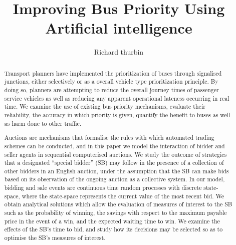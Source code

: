 \documentclass{comjnl}
\begin{document}
\title[Improving Bus Priority through Signalised Junctions using Artificial intelligence]{Improving Bus Priority Using Artificial intelligence}
\author{Richard thurbin}






\begin{abstract}

    Transport planners have implemented the prioritization of buses through signalised junctions, either selectively or as a overall vehicle type prioritization principle. 
    By doing so, planners are attempting to reduce the overall journey times of passenger service vehicles as well as reducing any apparent operational lateness occurring in real time.
    We examine the use of existing bus priority mechanisms, evaluate their reliability, the accuracy in which priority is given, quantify the benefit to buses as well as harm done to other traffic. 








    Auctions are mechanisms that formalise the rules with which
automated trading schemes can be conducted, and in this paper we
model the interaction of bidder and seller agents in sequential
computerised auctions. We study the outcome of strategies that a
designated ``special bidder'' (SB) may follow in the presence of a
collection of other bidders in an English auction, under the
assumption that the SB can make bids based on its observation of
the ongoing auction as a collective system. In our model, bidding
and sale events are continuous time random processes with discrete
state-space, where the state-space represents the current value of
the most recent bid. We obtain analytical solutions which allow
the evaluation of measures of interest to the SB such as the
probability of winning, the savings with respect to the maximum
payable price in the event of a win, and the expected waiting time
to win. We examine the effects of the SB's time to bid, and study
how its decisions may be selected so as to optimise the SB's
measures of interest.
\end{abstract}
\end{document}
